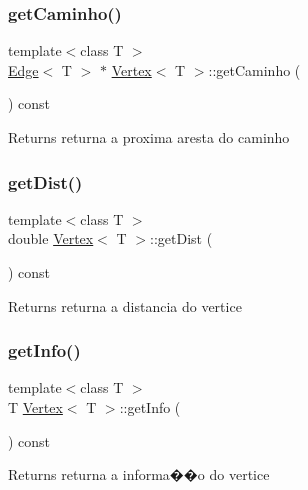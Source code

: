 \subsubsection{\texorpdfstring{get\+Caminho()}{getCaminho()}}
{\footnotesize\ttfamily template$<$class T $>$ \\
\mbox{\hyperlink{class_edge}{Edge}}$<$ T $>$ $\ast$ \mbox{\hyperlink{class_vertex}{Vertex}}$<$ T $>$\+::get\+Caminho (\begin{DoxyParamCaption}{ }\end{DoxyParamCaption}) const}

\begin{DoxyReturn}{Returns}
returna a proxima aresta do caminho 
\end{DoxyReturn}
\mbox{\label{class_vertex_a01e90e3cdb2ee11dd3b1d593c8207382}} 
\subsubsection{\texorpdfstring{get\+Dist()}{getDist()}}
{\footnotesize\ttfamily template$<$class T $>$ \\
double \mbox{\hyperlink{class_vertex}{Vertex}}$<$ T $>$\+::get\+Dist (\begin{DoxyParamCaption}{ }\end{DoxyParamCaption}) const}

\begin{DoxyReturn}{Returns}
returna a distancia do vertice 
\end{DoxyReturn}
\mbox{\label{class_vertex_a48eae2f7af2362634adab02b7b2dbec6}} 
\subsubsection{\texorpdfstring{get\+Info()}{getInfo()}}
{\footnotesize\ttfamily template$<$class T $>$ \\
T \mbox{\hyperlink{class_vertex}{Vertex}}$<$ T $>$\+::get\+Info (\begin{DoxyParamCaption}{ }\end{DoxyParamCaption}) const}

\begin{DoxyReturn}{Returns}
returna a informa��o do vertice 
\end{DoxyReturn}
\mbox{\label{class_vertex_abcb16841573094ec5328de67c9f7a174}} 
